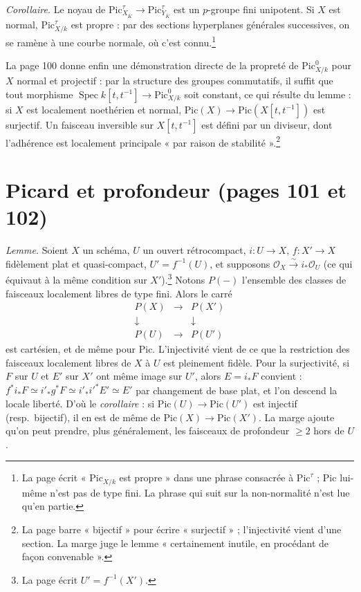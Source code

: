 \documentclass[11pt,a4paper]{article}
\begin{document}
\emph{Corollaire.} Le noyau de
$\mathrm{Pic}^\tau_{X_{\overline{K}}} \to \mathrm{Pic}^\tau_{Y_{\overline{K}}}$
est un $p$-groupe fini unipotent. Si $X$ est normal, $\mathrm{Pic}^\tau_{X/k}$
est propre : par des sections hyperplanes générales successives, on se ramène
à une courbe normale, où c'est connu.\footnote{La page écrit
« $\mathrm{Pic}_{X/k}$ est propre » dans une phrase consacrée à
$\mathrm{Pic}^\tau$ ; $\mathrm{Pic}$ lui-même n'est pas de type fini. La phrase
qui suit sur la non-normalité n'est lue qu'en partie.}

La page 100 donne enfin une démonstration directe de la propreté de
$\mathrm{Pic}^0_{X/k}$ pour $X$ normal et projectif : par la structure des
groupes commutatifs, il suffit que tout morphisme
$\operatorname{Spec} k[t, t^{-1}] \to \mathrm{Pic}^0_{X/k}$ soit constant, ce
qui résulte du lemme : si $X$ est localement noethérien et normal,
$\mathrm{Pic}(X) \to \mathrm{Pic}(X[t, t^{-1}])$ est surjectif. Un faisceau
inversible sur $X[t, t^{-1}]$ est défini par un diviseur, dont l'adhérence est
localement principale « par raison de stabilité ».\footnote{La page barre
« bijectif » pour écrire « surjectif » ; l'injectivité vient d'une section.
La marge juge le lemme « certainement inutile, en procédant de façon
convenable ».}

\section*{Picard et profondeur (pages 101 et 102)}

\emph{Lemme.} Soient $X$ un schéma, $U$ un ouvert rétrocompact, $i \colon U \to X$,
$f \colon X' \to X$ fidèlement plat et quasi-compact, $U' = f^{-1}(U)$, et
supposons $\mathcal{O}_X \xrightarrow{\sim} i_*\mathcal{O}_U$ (ce qui équivaut à
la même condition sur $X'$).\footnote{La page écrit $U' = f^{-1}(X')$.} Notons
$P(-)$ l'ensemble des classes de faisceaux localement libres de type fini.
Alors le carré
\[
\begin{array}{ccc}
P(X) & \longrightarrow & P(X') \\
\downarrow & & \downarrow \\
P(U) & \longrightarrow & P(U')
\end{array}
\]
est cartésien, et de même pour $\mathrm{Pic}$. L'injectivité vient de ce que
la restriction des faisceaux localement libres de $X$ à $U$ est pleinement
fidèle. Pour la surjectivité, si $F$ sur $U$ et $E'$ sur $X'$ ont même image
sur $U'$, alors $E = i_*F$ convient : $f^*i_*F \simeq i'_*g^*F \simeq i'_*i'^*E' \simeq E'$
par changement de base plat, et l'on descend la locale liberté. D'où le
\emph{corollaire} : si $\mathrm{Pic}(U) \to \mathrm{Pic}(U')$ est injectif
(resp.\ bijectif), il en est de même de $\mathrm{Pic}(X) \to \mathrm{Pic}(X')$.
La marge ajoute qu'on peut prendre, plus généralement, les faisceaux de
profondeur $\geq 2$ hors de $U$.
\end{document}
